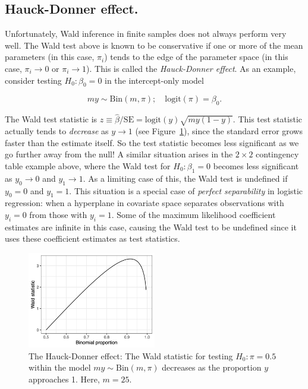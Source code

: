 \documentclass[
  11pt,
  letterpaper,
  oneside]{book}
\theoremstyle{definition}
\theoremstyle{plain}
\theoremstyle{plain}
\theoremstyle{plain}
\theoremstyle{remark}
\begin{document}
\hypertarget{sec-hauck-donner-effect}{%
\subsection{Hauck-Donner effect.}\label{sec-hauck-donner-effect}}

Unfortunately, Wald inference in finite samples does not always perform
very well. The Wald test above is known to be conservative if one or
more of the mean parameters (in this case, \(\pi_i\)) tends to the edge
of the parameter space (in this case, \(\pi_i \rightarrow 0\) or
\(\pi_i \rightarrow 1\)). This is called the \emph{Hauck-Donner effect}.
As an example, consider testing \(H_0: \beta_0 = 0\) in the
intercept-only model

\[
my \sim \text{Bin}(m, \pi); \quad \text{logit}(\pi) = \beta_0.
\]

The Wald test statistic is
\(z \equiv \widehat \beta/\text{SE} = \text{logit}(y)\sqrt{my(1-y)}\).
This test statistic actually tends to \emph{decrease} as
\(y \rightarrow 1\) (see Figure~\ref{fig-hauck-donner}), since the
standard error grows faster than the estimate itself. So the test
statistic becomes less significant as we go further away from the null!
A similar situation arises in the \(2 \times 2\) contingency table
example above, where the Wald test for \(H_0: \beta_1 = 0\) becomes less
significant as \(y_0 \rightarrow 0\) and \(y_1 \rightarrow 1\). As a
limiting case of this, the Wald test is undefined if \(y_0 = 0\) and
\(y_1 = 1\). This situation is a special case of \emph{perfect
separability} in logistic regression: when a hyperplane in covariate
space separates observations with \(y_i = 0\) from those with
\(y_i = 1\). Some of the maximum likelihood coefficient estimates are
infinite in this case, causing the Wald test to be undefined since it
uses these coefficient estimates as test statistics.

\begin{figure}

{\centering \includegraphics[width=0.5\textwidth,height=\textheight]{figures/hauck-donner.png}

}

\caption{\label{fig-hauck-donner}The Hauck-Donner effect: The Wald
statistic for testing \(H_0: \pi = 0.5\) within the model
\(my \sim \text{Bin}(m, \pi)\) decreases as the proportion \(y\)
approaches 1. Here, \(m = 25\).}

\end{figure}
\end{document}
